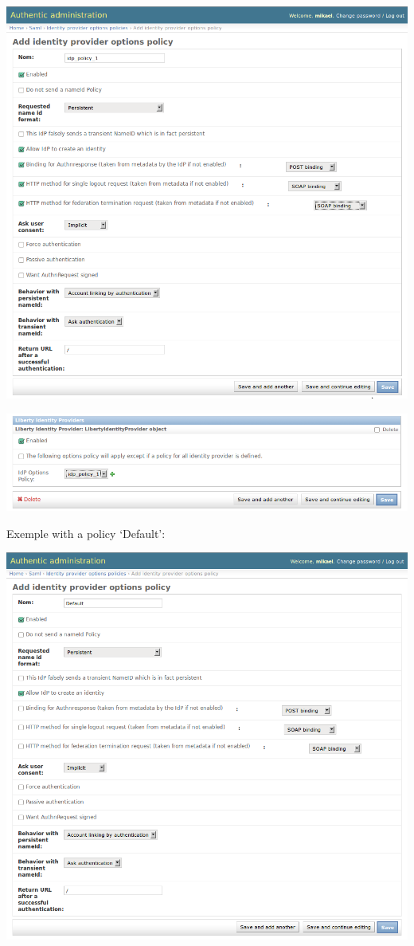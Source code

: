\documentclass[letterpaper,10pt,english]{sphinxmanual}
\begin{document}
\includegraphics{sp_options_regular.png}

\includegraphics{sp_options_regular_modify_sp.png}

Exemple with a policy `Default':

\includegraphics{sp_options_default.png}
\end{document}

